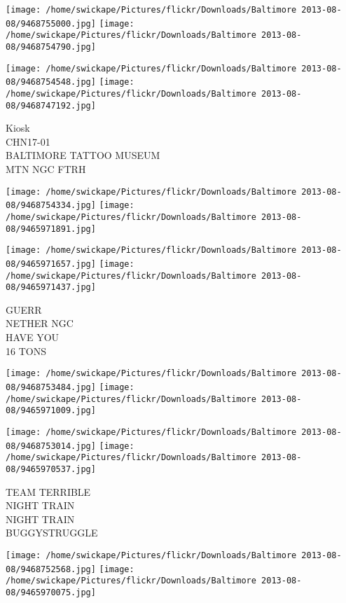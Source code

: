 \documentclass[10pt,letterpaper]{article}
\begin{document}
\texttt{[image: /home/swickape/Pictures/flickr/Downloads/Baltimore 2013-08-08/9468755000.jpg]}
\texttt{[image: /home/swickape/Pictures/flickr/Downloads/Baltimore 2013-08-08/9468754790.jpg]}

\texttt{[image: /home/swickape/Pictures/flickr/Downloads/Baltimore 2013-08-08/9468754548.jpg]}
\texttt{[image: /home/swickape/Pictures/flickr/Downloads/Baltimore 2013-08-08/9468747192.jpg]}

Kiosk\\
CHN17{-}01\\
BALTIMORE TATTOO MUSEUM\\
MTN NGC FTRH\\
\pagebreak

\texttt{[image: /home/swickape/Pictures/flickr/Downloads/Baltimore 2013-08-08/9468754334.jpg]}
\texttt{[image: /home/swickape/Pictures/flickr/Downloads/Baltimore 2013-08-08/9465971891.jpg]}

\texttt{[image: /home/swickape/Pictures/flickr/Downloads/Baltimore 2013-08-08/9465971657.jpg]}
\texttt{[image: /home/swickape/Pictures/flickr/Downloads/Baltimore 2013-08-08/9465971437.jpg]}

GUERR\\
NETHER NGC\\
HAVE YOU\\
16 TONS\\
\pagebreak

\texttt{[image: /home/swickape/Pictures/flickr/Downloads/Baltimore 2013-08-08/9468753484.jpg]}
\texttt{[image: /home/swickape/Pictures/flickr/Downloads/Baltimore 2013-08-08/9465971009.jpg]}

\texttt{[image: /home/swickape/Pictures/flickr/Downloads/Baltimore 2013-08-08/9468753014.jpg]}
\texttt{[image: /home/swickape/Pictures/flickr/Downloads/Baltimore 2013-08-08/9465970537.jpg]}

TEAM TERRIBLE\\
NIGHT TRAIN\\
NIGHT TRAIN\\
BUGGYSTRUGGLE\\
\pagebreak

\texttt{[image: /home/swickape/Pictures/flickr/Downloads/Baltimore 2013-08-08/9468752568.jpg]}
\texttt{[image: /home/swickape/Pictures/flickr/Downloads/Baltimore 2013-08-08/9465970075.jpg]}
\end{document}
